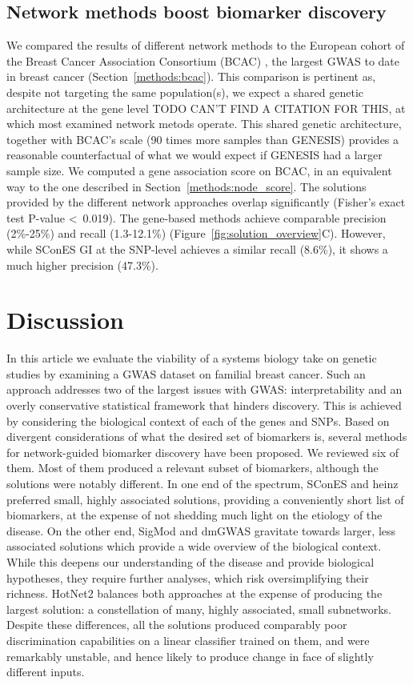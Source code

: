 \documentclass[twocolumn, 11pt]{article}
\begin{document}
\subsection{Network methods boost biomarker discovery}

We compared the results of different network methods to the European cohort of the Breast Cancer Association Consortium (BCAC) \cite{Michailidou2017}, the largest GWAS to date in breast cancer (Section~\ref{methods:bcac}). This comparison is pertinent as, despite not targeting the same population(s), we expect a shared genetic architecture at the gene level \cite{required} TODO CAN'T FIND A CITATION FOR THIS, at which most examined network metods operate. This shared genetic architecture, together with BCAC's scale (90 times more samples than GENESIS) provides a reasonable counterfactual of what we would expect if GENESIS had a larger sample size. We computed a gene association score on BCAC, in an equivalent way to the one described in Section~\ref{methods:node_score}. The solutions provided by the different network approaches overlap significantly (Fisher's exact test P-value \textless~0.019). The gene-based methods achieve comparable precision (2\%-25\%) and recall (1.3-12.1\%) (Figure~\ref{fig:solution_overview}C). However, while SConES GI at the SNP-level achieves a similar recall (8.6\%), it shows a much higher precision (47.3\%).

\section{Discussion}

In this article we evaluate the viability of a systems biology take on genetic studies by examining a GWAS dataset on familial breast cancer. Such an approach addresses two of the largest issues with GWAS: interpretability and an overly conservative statistical framework that hinders discovery. This is achieved by considering the biological context of each of the genes and SNPs. Based on divergent considerations of what the desired set of biomarkers is, several methods for network-guided biomarker discovery have been proposed. We reviewed six of them. Most of them produced a relevant subset of biomarkers, although the solutions were notably different. In one end of the spectrum, SConES and heinz preferred small, highly associated solutions, providing a conveniently short list of biomarkers, at the expense of not shedding much light on the etiology of the disease. On the other end, SigMod and dmGWAS gravitate towards larger, less associated solutions which provide a wide overview of the biological context. While this deepens our understanding of the disease and provide biological hypotheses, they require further analyses, which risk oversimplifying their richness. HotNet2 balances both approaches at the expense of producing the largest solution: a constellation of many, highly associated, small subnetworks. Despite these differences, all the solutions produced comparably poor discrimination capabilities on a linear classifier trained on them, and were remarkably unstable, and hence likely to produce change in face of slightly different inputs.
\end{document}
